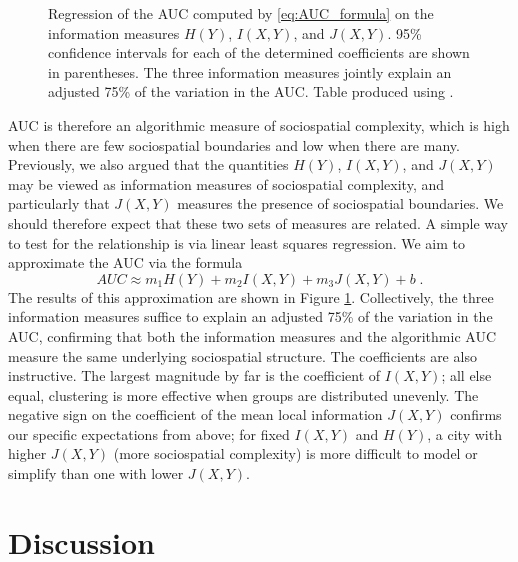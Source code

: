 \documentclass[english]{scrartcl}
\begin{document}
		\begin{figure}
			\centering
			
			\caption{Regression of the AUC computed by \eqref{eq:AUC_formula} on the information measures $H(Y)$, $I(X,Y)$, and $J(X,Y)$. 95\% confidence intervals for each of the determined coefficients are shown in parentheses. The three information measures jointly explain an adjusted 75\% of the variation in the AUC. Table produced using \cite{Marek2015}.}\label{fig:regression}
		\end{figure}

		AUC is therefore an algorithmic measure of sociospatial complexity, which is high when there are few sociospatial boundaries and low when there are many. Previously, we also argued that the quantities $H(Y)$, $I(X,Y)$, and $J(X,Y)$ may be viewed as information measures of sociospatial complexity, and particularly that $J(X,Y)$ measures the presence of sociospatial boundaries. We should therefore expect that these two sets of measures are related. A simple way to test for the relationship is via linear least squares regression. We aim to approximate the AUC via the formula
		\begin{equation*}
			AUC \approx m_1H(Y) + m_2I(X,Y) + m_3J(X,Y) + b\;.
		\end{equation*}
		The results of this approximation are shown in Figure \ref{fig:regression}. Collectively, the three information measures suffice to explain an adjusted 75\% of the variation in the AUC, confirming that both the information measures and the algorithmic AUC measure the same underlying sociospatial structure. The coefficients are also instructive. The largest magnitude by far is the coefficient of $I(X,Y)$; all else equal, clustering is more effective when groups are distributed unevenly. The negative sign on the coefficient of the mean local information $J(X,Y)$ confirms our specific expectations from above; for fixed $I(X,Y)$ and $H(Y)$, a city with higher $J(X,Y)$ (more sociospatial complexity) is more difficult to model or simplify than one with lower $J(X,Y)$. 

\section{Discussion} \label{sec:discussion}
\end{document}
